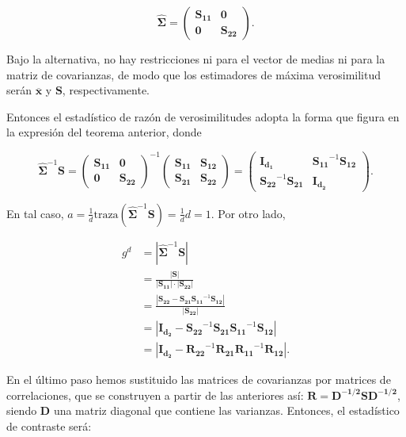 \documentclass[
  a4paper,
  oneside]{scrbook}
\theoremstyle{definition}
\theoremstyle{definition}
\theoremstyle{definition}
\theoremstyle{definition}
\theoremstyle{remark}
\begin{document}
\[\hat{\bm\Sigma}=\left(\begin{array}{cc} \bm{S_{11}} & \bm{0} \\
\bm{0} & \bm{S_{22}} \end{array}\right).\]

Bajo la alternativa, no hay restricciones ni para el vector de medias ni
para la matriz de covarianzas, de modo que los estimadores de máxima
verosimilitud serán \(\overline{\bm{x}}\) y \(\bm{S}\), respectivamente.

Entonces el estadístico de razón de verosimilitudes adopta la forma que
figura en la expresión del teorema anterior, donde

\[\hat{\bm\Sigma}^{-1}\bm{S}=\left(\begin{array}{cc} \bm{S_{11}} & \bm{0} \\
\bm{0} & \bm{S_{22}} \end{array}\right)^{-1} \left(\begin{array}{cc} \bm{S_{11}} & \bm{S_{12}} \\
\bm{S_{21}} & \bm{S_{22}} \end{array}\right)
=\left(\begin{array}{cc} \bm{I_{d_1}} & \bm{S_{11}}^{-1}\bm{S_{12}} \\
\bm{S_{22}}^{-1}\bm{S_{21}} & \bm{I_{d_2}} \end{array}\right).\]

En tal caso,
\(a=\frac{1}{d}\mbox{traza}\left(\hat{\bm\Sigma}^{-1}\bm{S}\right)=\frac{1}{d}d=1\).
Por otro lado,

\[
\begin{aligned}
g^d&=\left|\hat{\bm\Sigma}^{-1}\bm{S}\right|\\
&=\frac{|\bm{S}|}{|\bm{S_{11}}|\cdot |\bm{S_{22}}|}\\
&=\frac{|\bm{S_{22}}-\bm{S_{21}}\bm{S_{11}}^{-1}\bm{S_{12}}|}{|\bm{S_{22}}|}\\
&=\left|\bm{I_{d_2}}-\bm{S_{22}}^{-1}\bm{S_{21}}\bm{S_{11}}^{-1}\bm{S_{12}}\right|\\
&=\left|\bm{I_{d_2}}-\bm{R_{22}}^{-1}\bm{R_{21}}\bm{R_{11}}^{-1}\bm{R_{12}}\right|.
\end{aligned}\]

En el último paso hemos sustituido las matrices de covarianzas por
matrices de correlaciones, que se construyen a partir de las anteriores
así: \(\bm{R}=\bm{D^{-1/2}}\bm{S}\bm{D^{-1/2}}\), siendo \(\bm{D}\) una
matriz diagonal que contiene las varianzas. Entonces, el estadístico de
contraste será:
\end{document}
